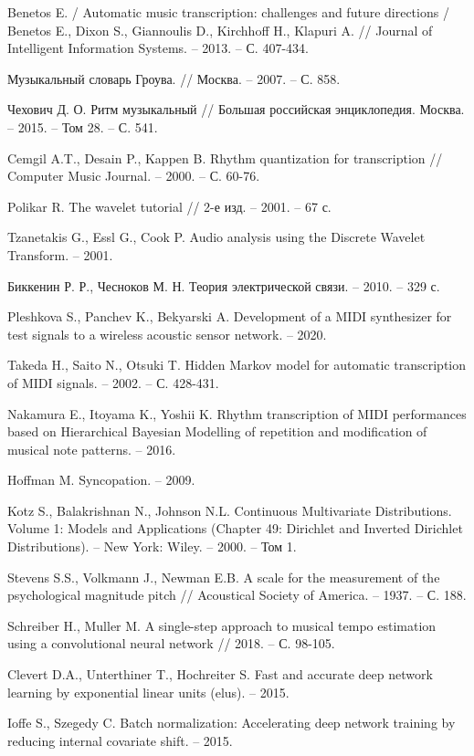 
\begingroup
\renewcommand{\section}[2]{}
\begin{thebibliography}{}
	
Benetos E. / Automatic music transcription: challenges and future directions / Benetos E., Dixon S., Giannoulis D., Kirchhoff H., Klapuri A. // Journal of Intelligent Information Systems. -- 2013. -- С. 407-434.

Музыкальный словарь Гроува. // Москва. -- 2007. -- С. 858.

Чехович Д. О. Ритм музыкальный // Большая российская энциклопедия. Москва. -- 2015. -- Том 28. -- С. 541.

Cemgil A.T., Desain P., Kappen B. Rhythm quantization for transcription // Computer Music Journal. -- 2000. -- С. 60-76.

Polikar R. The wavelet tutorial // 2-е изд. -- 2001. -- 67 с.

Tzanetakis G., Essl G., Cook P. Audio analysis using the Discrete Wavelet Transform. -- 2001.

Биккенин Р. Р., Чесноков М. Н. Теория электрической связи. -- 2010. -- 329 с.

Pleshkova S., Panchev K., Bekyarski A. Development of a MIDI synthesizer for test signals to a wireless acoustic sensor network. -- 2020.

Takeda H., Saito N., Otsuki T. Hidden Markov model for automatic transcription of MIDI signals. -- 2002. -- С. 428-431.

Nakamura E., Itoyama K., Yoshii K. Rhythm transcription of MIDI performances based on Hierarchical Bayesian Modelling of repetition and modification of musical note patterns. -- 2016.

Hoffman M. Syncopation. -- 2009.

Kotz S., Balakrishnan N., Johnson N.L. Continuous Multivariate Distributions. Volume 1: Models and Applications (Chapter 49: Dirichlet and Inverted Dirichlet Distributions). -- New York: Wiley. -- 2000. -- Том 1.

Stevens S.S., Volkmann J., Newman E.B. A scale for the measurement of the psychological magnitude pitch // Acoustical Society of America. -- 1937. -- С. 188.

Schreiber H., Muller M. A single-step approach to musical tempo estimation using a convolutional neural network // 2018. -- С. 98-105.

Clevert D.A., Unterthiner T., Hochreiter S. Fast and accurate deep network learning by exponential linear units (elus). -- 2015.

Ioffe S., Szegedy C. Batch normalization: Accelerating deep network training by reducing internal covariate shift. -- 2015.

\end{thebibliography}
\endgroup